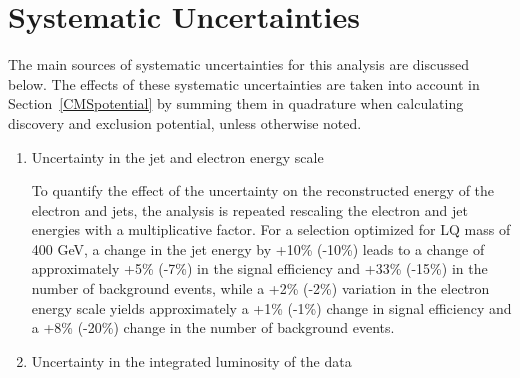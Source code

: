 %

\section{Systematic Uncertainties} \label{sec:Systematics}

The main sources of systematic uncertainties for this analysis are discussed below.
The effects of these systematic uncertainties are taken into account in Section~\ref{CMSpotential} 
by summing them in quadrature when calculating discovery and exclusion potential, unless otherwise noted.
%
\begin{enumerate}
\item Uncertainty in the jet and electron energy scale

To quantify the effect of the uncertainty on the reconstructed energy of the electron and jets,
the analysis is repeated rescaling the electron and jet energies
 with a multiplicative factor. 
For a selection optimized for LQ mass of 400 GeV, a change in the jet energy by +10\% (-10\%) leads 
to a change of approximately +5\% (-7\%) in the signal efficiency and +33\% (-15\%) in the number of background events, 
while a +2\% (-2\%) variation in the electron energy scale yields approximately a +1\% (-1\%) 
change in signal efficiency and a +8\% (-20\%) change in the number of background events. 


\item Uncertainty in the integrated luminosity of the data


\end{enumerate}
